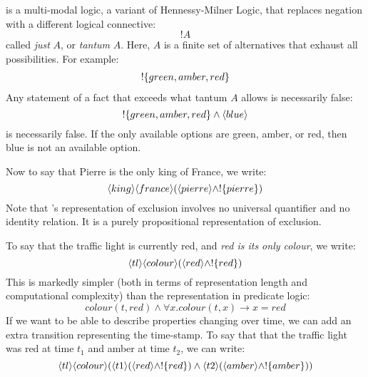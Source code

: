 \ELFULL{} is a multi-modal logic, a variant of Hennessy-Milner Logic, that replaces negation with a different logical connective:
\[
   !A
\]
called \emph{just} $A$, or \emph{tantum} $A$.
Here, $A$ is a finite set of alternatives that exhaust all
possibilities. 
For example:
\begin{eqnarray*}
! \{green, amber, red\}
\end{eqnarray*}
Any statement of a fact that exceeds what tantum $A$ allows is necessarily false:
\[
   !\{green, amber, red\} \land \langle blue \rangle \]
is necessarily false.
If the only available options are green, amber, or red, then blue is not an available option.

Now to say that Pierre is the only king of France, we write:
\[
\langle king \rangle \langle france \rangle (\langle pierre \rangle \land ! \{pierre\})
\]
Note that \ELFULL{}'s representation of exclusion involves no universal quantifier and no identity relation.
It is a purely propositional representation of exclusion.

To say that the traffic light is currently red, and \emph{red is its only colour}, we write:
\[
\langle tl \rangle \langle colour \rangle (\langle red \rangle \land !\{red\})
\]
This is markedly simpler (both in terms of representation length and computational complexity) than the representation in predicate logic:
\[
colour(t, red) \land \forall x . colour(t, x) \rightarrow x = red
\]
If we want to be able to describe properties changing over time, we can add an extra transition representing the time-stamp.
To say that that the traffic light was red at time $t_1$ and amber at time $t_2$, we can write:
\[
\langle tl \rangle \langle colour \rangle (\langle t1 \rangle (\langle red \rangle \land !\{red\}) \land \langle t2 \rangle (\langle amber \rangle \land !\{amber\}))
\]


